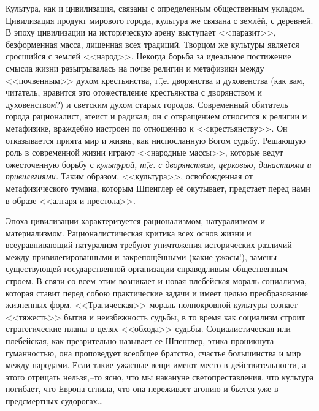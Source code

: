 Культура, как и цивилизация, связаны с определенным общественным укладом. Цивилизация продукт мирового города, культура же связана с землёй, с деревней. В эпоху цивилизации на историческую арену выступает <<паразит>>, безформенная масса, лишенная всех традиций. Творцом же культуры является  сросшийся с землей <<народ>>. Некогда борьба за идеальное постижение смысла жизни разыгрывалась на почве религии и метафизики между <<почвенным>> духом крестьянства, т.\=,е. дворянства и духовенства (как вам, читатель, нравится это отожествление крестьянства с дворянством и духовенством?) и светским духом старых городов. Современный обитатель города рационалист, атеист и радикал; он с отвращением относится к религии и метафизике, враждебно настроен по отношению к <<крестьянству>>. Он отказывается прията мир и жизнь, как ниспосланную Богом судьбу. Решающую роль в современной жизни играют <<народные массы>>, которые ведут ожесточенную борьбу с \emph{культурой, т\=,е. с дворянством, церковью, династиями и привилегиями.} Таким образом, <<культура>>, освобожденная от метафизического тумана, которым Шпенглер её окутывает, предстает перед нами в образе <<алтаря и престола>>.

Эпоха цивилизации характеризуется рационализмом, натурализмом и материализмом. Рационалистическая критика всех основ жизни и всеуравнивающий натурализм требуют уничтожения исторических различий между привилегированными и закрепощёнными (какие ужасы!), замены существующей государственной организации справедливым общественным строем. В связи со всем этим возникает и новая плебейская мораль социализма, которая ставит перед собою практические задачи и имеет целью преобразование жизненных форм. <<Трагическая>> мораль полнокровной культуры сознает <<тяжесть>> бытия и неизбежность судьбы, в то время как социализм строит стратегические планы в целях <<обхода>> судьбы. Социалистическая или плебейская, как презрительно называет ее Шпенглер, этика проникнута гуманностью, она проповедует всеобщее братство, счастье большинства и мир между народами. Если такие ужасные вещи имеют место в действительности, а этого отрицать нельзя,\---то ясно, что мы накануне светопреставления, что культура погибает, что Европа сгнила, что она переживает агонию и бьется уже в предсмертных судорогах\dots

\begin{center}
 \noindent\textasteriskcentered\ \textasteriskcentered\ \textasteriskcentered
\end{center}


